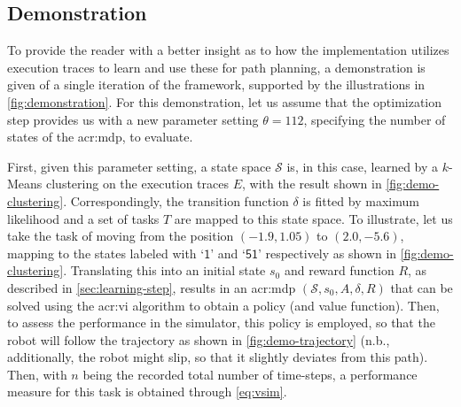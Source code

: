 \newpage

\subsection{Demonstration}
\label{sec:demonstration}

To provide the reader with a better insight as to how the implementation utilizes execution traces to learn  and use these for path planning, a demonstration is given of a single iteration of the framework, supported by the illustrations in \autoref{fig:demonstration}.
For this demonstration, let us assume that the optimization step provides us with a new parameter setting $\theta = 112$, specifying the number of states of the \acrshort{acr:mdp}, to evaluate.

First, given this parameter setting, a state space $\mathcal{S}$ is, in this case, learned by a $k$-Means clustering on the execution traces $E$, with the result shown in \autoref{fig:demo-clustering}.
Correspondingly, the transition function $\delta$ is fitted by maximum likelihood and a set of tasks $T$ are mapped to this state space.
To illustrate, let us take the task of moving from the position $(-1.9, 1.05)$ to $(2.0, -5.6)$, mapping to the states labeled with `$\mathsf{1}$' and `$\mathsf{51}$' respectively as shown in \autoref{fig:demo-clustering}.
Translating this into an initial state $s_0$ and reward function $R$, as described in \autoref{sec:learning-step}, results in an \acrshort{acr:mdp} $(\mathcal{S}, s_0, A, \delta, R)$ that can be solved using the \acrshort{acr:vi} algorithm to obtain a policy (and value function).
Then, to assess the performance in the simulator, this policy is employed, so that the robot will follow the trajectory as shown in \autoref{fig:demo-trajectory} (n.b., additionally, the robot might slip, so that it slightly deviates from this path).
Then, with $n$ being the recorded total number of time-steps, a performance measure for this task is obtained through \autoref{eq:vsim}.

%

